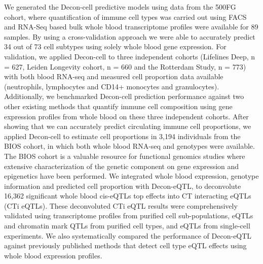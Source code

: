 We generated the Decon-cell predictive models using data from the  500FG cohort\cite{neteaUnderstandingHumanImmune2016}, where quantification of immune cell types was carried out using FACS\cite{aguirre-gamboaDifferentialEffectsEnvironmental2016} and RNA-Seq based bulk whole blood transcriptome profiles were available for 89 samples\cite{bakkerIntegrationMultiomicsData2018}. By using a cross-validation approach we were able to accurately predict 34 out of 73 cell subtypes using solely whole blood gene expression. For validation, we applied Decon-cell to three independent cohorts (Lifelines Deep\cite{tigchelaarCohortProfileLifeLines2015}, n = 627, Leiden Longevity cohort\cite{deelenGenomewideAssociationMetaanalysis2014}, n = 660 and the Rotterdam Study\cite{hofmanRotterdamStudy20162015}, n = 773) with both blood RNA-seq and measured cell proportion data available (neutrophils, lymphocytes and CD14+ monocytes and granulocytes). Additionally, we benchmarked Decon-cell prediction performance against two other existing methods that quantify immune cell composition using gene expression profiles from whole blood on these three independent cohorts. After showing that we can accurately predict circulating immune cell proportions, we applied Decon-cell to estimate cell proportions in 3,194 individuals from the BIOS cohort\cite{tigchelaarCohortProfileLifeLines2015,greevenbroekCrosssectionalAssociationInsulin2011,schoenmakerEvidenceGeneticEnrichment2006,willemsenNetherlandsTwinRegister2010}, in which both whole blood RNA-seq and genotypes were available. The BIOS cohort is a valuable resource for functional genomics studies where extensive characterization of the genetic component on gene expression\cite{zhernakovaIdentificationContextdependentExpression2017} and epigenetics\cite{bonderDiseaseVariantsAlter2017a} have been performed. We integrated whole blood expression, genotype information and predicted cell proportion with Decon-eQTL, to deconvolute 16,362 significant whole blood cis-eQTLs top effects into CT interacting eQTLs (CTi eQTLs). These deconvoluted CTi eQTL results were comprehensively validated using transcriptome profiles from purified cell sub-populations\cite{adamsBLUEPRINTDecodeEpigenetic2012}, eQTLs and chromatin mark QTLs from purified cell types\cite{chenGeneticDriversEpigenetic2016}, and eQTLs from single-cell experiments\cite{wijstSinglecellRNASequencing2018}. We also systematically compared the performance of Decon-eQTL against previously published methods\cite{westraCellSpecificEQTL2015,zhernakovaIdentificationContextdependentExpression2017} that detect cell type eQTL effects using whole blood expression profiles. 

